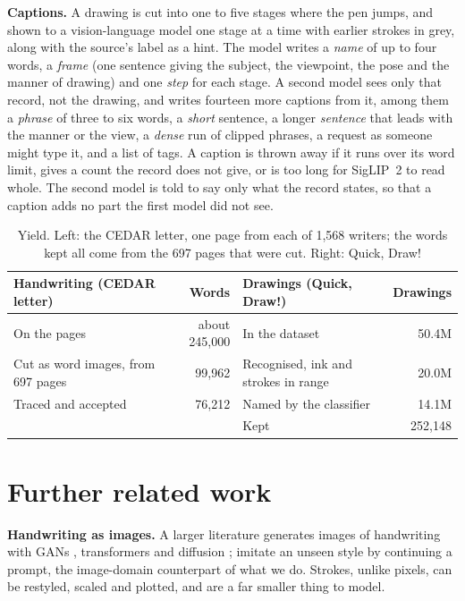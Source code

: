 \documentclass{article}
\begin{document}
\textbf{Captions.} A drawing is cut into one to five stages where the pen jumps, and shown to a vision-language model one stage at a time with earlier strokes in grey, along with the source's label as a hint. The model writes a \emph{name} of up to four words, a \emph{frame} (one sentence giving the subject, the viewpoint, the pose and the manner of drawing) and one \emph{step} for each stage. A second model sees only that record, not the drawing, and writes fourteen more captions from it, among them a \emph{phrase} of three to six words, a \emph{short} sentence, a longer \emph{sentence} that leads with the manner or the view, a \emph{dense} run of clipped phrases, a request as someone might type it, and a list of tags. A caption is thrown away if it runs over its word limit, gives a count the record does not give, or is too long for SigLIP~2 to read whole. The second model is told to say only what the record states, so that a caption adds no part the first model did not see.

\begin{table}[H]
\caption{Yield. Left: the CEDAR letter, one page from each of 1,568 writers; the words kept all come from the 697 pages that were cut. Right: Quick, Draw!}
\label{tab:yield}
\vskip 0.1in
\begin{center}
\begin{small}
\begin{tabular}{lr@{\hskip 3em}lr}
\toprule
Handwriting (CEDAR letter) & Words & Drawings (Quick, Draw!) & Drawings \\
\midrule
On the pages & about 245,000 & In the dataset & 50.4M \\
Cut as word images, from 697 pages & 99,962 & Recognised, ink and strokes in range & 20.0M \\
Traced and accepted & 76,212 & Named by the classifier & 14.1M \\
 & & Kept & 252,148 \\
\bottomrule
\end{tabular}
\end{small}
\end{center}
\end{table}

\section{Further related work}
\label{app:related}

\textbf{Handwriting as images.} A larger literature generates images of handwriting with GANs \citep{alonso2019adversarial,fogel2020scrabblegan,kang2020ganwriting}, transformers \citep{bhunia2021handwriting,wang2022approach,pippi2023handwritten} and diffusion \citep{nikolaidou2023wordstylist,dai2024one,nikolaidou2024diffusionpen}; \citet{pippi2025zero} imitate an unseen style by continuing a prompt, the image-domain counterpart of what we do. Strokes, unlike pixels, can be restyled, scaled and plotted, and are a far smaller thing to model.
\end{document}
